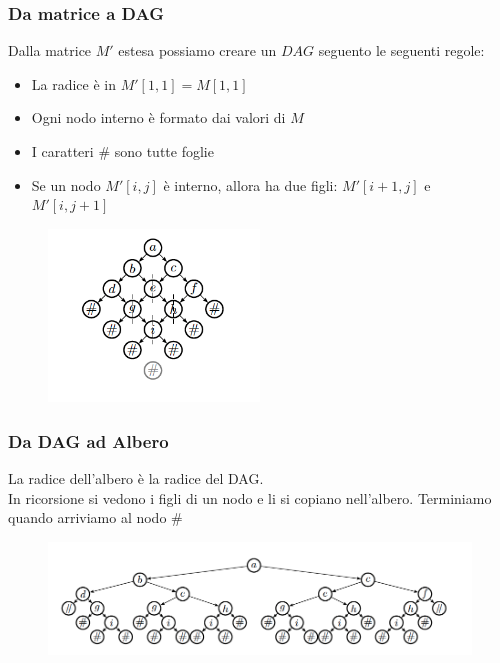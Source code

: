 \documentclass{beamer}
\begin{document}
\begin{frame}
\frametitle{Da matrice a DAG}

Dalla matrice $M'$ estesa possiamo creare un $DAG$ seguento le seguenti regole:
\begin{itemize}
\item La radice è in $M'[1,1] = M[1,1]$
\item Ogni nodo interno è formato dai valori di $M$
\item I caratteri $\# $ sono tutte foglie
\item Se un nodo $M'[i,j]$ è interno, allora ha due figli: $M'[i+1,j]$ e $M'[i,j+1]$
\end{itemize}

\begin{figure}[p]
    \includegraphics[width=0.5\textwidth]{dag.png}
\end{figure}
\end{frame}

\begin{frame}
\frametitle{Da DAG ad Albero}
La radice dell'albero è la radice del DAG.\\
In ricorsione si vedono i figli di un nodo e li si copiano nell'albero. Terminiamo quando arriviamo al nodo $\#$
\begin{figure}[p]
    \includegraphics[width=1\textwidth]{tree.png}
\end{figure}


\end{frame}
\end{document}
